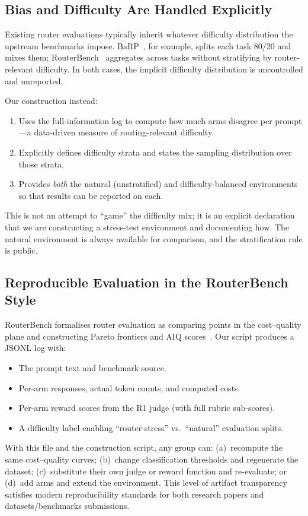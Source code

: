 \subsection{Bias and Difficulty Are Handled Explicitly}
\label{app:difficulty_bias}

Existing router evaluations typically inherit whatever difficulty
distribution the upstream benchmarks impose.
BaRP~\cite{wang2025barp}, for example, splits each task 80/20 and mixes
them; RouterBench~\cite{hu2024routerbench} aggregates across tasks
without stratifying by router-relevant difficulty.
In both cases, the implicit difficulty distribution is uncontrolled and
unreported.

Our construction instead:
\begin{enumerate}[nosep,leftmargin=*]
  \item Uses the full-information log to compute how much arms disagree
    per prompt---a data-driven measure of routing-relevant difficulty.
  \item Explicitly defines difficulty strata and states the sampling
    distribution over those strata.
  \item Provides \emph{both} the natural (unstratified) and
    difficulty-balanced environments so that results can be reported
    on each.
\end{enumerate}

This is not an attempt to ``game'' the difficulty mix; it is an explicit
declaration that we are constructing a stress-test environment and
documenting how.
The natural environment is always available for comparison, and the
stratification rule is public.

\subsection{Reproducible Evaluation in the RouterBench Style}
\label{app:reproducibility}

RouterBench formalises router evaluation as comparing points in the
cost--quality plane and constructing Pareto frontiers and AIQ
scores~\cite{hu2024routerbench}.
Our script produces a JSONL log with:
\begin{itemize}[nosep,leftmargin=*]
  \item The prompt text and benchmark source.
  \item Per-arm responses, actual token counts, and computed costs.
  \item Per-arm reward scores from the R1 judge (with full rubric
    sub-scores).
  \item A difficulty label enabling ``router-stress'' vs.\ ``natural''
    evaluation splits.
\end{itemize}
With this file and the construction script, any group can: (a)~recompute
the same cost--quality curves; (b)~change classification thresholds and
regenerate the dataset; (c)~substitute their own judge or reward
function and re-evaluate; or (d)~add arms and extend the environment.
This level of artifact transparency satisfies modern reproducibility
standards for both research papers and datasets/benchmarks
submissions.

